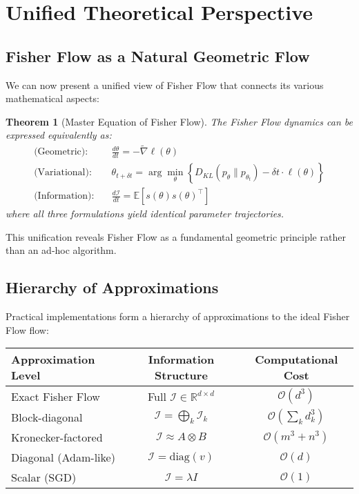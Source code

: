 \documentclass[11pt]{article}
\newtheorem{theorem}{Theorem}
\begin{document}
\section{Unified Theoretical Perspective}

\subsection{Fisher Flow as a Natural Geometric Flow}

We can now present a unified view of Fisher Flow that connects its various mathematical aspects:

\begin{theorem}[Master Equation of Fisher Flow]
\label{thm:master}
The Fisher Flow dynamics can be expressed equivalently as:
\begin{align}
\text{(Geometric):} \quad & \frac{d\theta}{dt} = -\tilde{\nabla} \ell(\theta) \\
\text{(Variational):} \quad & \theta_{t+\delta t} = \arg\min_\theta \left\{D_{KL}(p_\theta \| p_{\theta_t}) - \delta t \cdot \ell(\theta)\right\} \\
\text{(Information):} \quad & \frac{d\mathcal{I}}{dt} = \mathbb{E}[s(\theta)s(\theta)^\top]
\end{align}
where all three formulations yield identical parameter trajectories.
\end{theorem}

This unification reveals Fisher Flow as a fundamental geometric principle rather than an ad-hoc algorithm.

\subsection{Hierarchy of Approximations}

Practical implementations form a hierarchy of approximations to the ideal Fisher Flow flow:

\begin{center}
\begin{tabular}{lcc}
\toprule
\textbf{Approximation Level} & \textbf{Information Structure} & \textbf{Computational Cost} \\
\midrule
Exact Fisher Flow & Full $\mathcal{I} \in \mathbb{R}^{d \times d}$ & $\mathcal{O}(d^3)$ \\
Block-diagonal & $\mathcal{I} = \bigoplus_k \mathcal{I}_k$ & $\mathcal{O}(\sum_k d_k^3)$ \\
Kronecker-factored & $\mathcal{I} \approx A \otimes B$ & $\mathcal{O}(m^3 + n^3)$ \\
Diagonal (Adam-like) & $\mathcal{I} = \text{diag}(v)$ & $\mathcal{O}(d)$ \\
Scalar (SGD) & $\mathcal{I} = \lambda I$ & $\mathcal{O}(1)$ \\
\bottomrule
\end{tabular}
\end{center}
\end{document}
